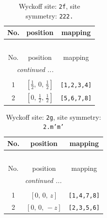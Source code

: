 \documentclass[fleqn,8pt]{jsarticle}
\begin{document}
\renewcommand{\arraystretch}{1.2}
\begin{longtable}{ccc}
\caption{Wyckoff site: {\tt 2f}, site symmetry: {\tt 222.}}
 \\
 \hline \hline
No. & position & mapping \\ \hline \endfirsthead

\multicolumn{2}{l}{\tablename\ \thetable{}} \\
 \hline \hline
No. & position & mapping \\ \hline \endhead

 \hline \hline
\multicolumn{2}{r}{\footnotesize\it continued ...} \\ \endfoot

 \hline \hline
\multicolumn{2}{r}{} \\ \endlastfoot

1 & $\left[ \frac{1}{2},\, 0,\, \frac{1}{2} \right]$ & {\tt [1,2,3,4]} \\ \hline
2 & $\left[ 0,\, \frac{1}{2},\, \frac{1}{2} \right]$ & {\tt [5,6,7,8]} \\
\end{longtable}
\renewcommand{\arraystretch}{1.2}
\begin{longtable}{ccc}
\caption{Wyckoff site: {\tt 2g}, site symmetry: {\tt 2.m'm'}}
 \\
 \hline \hline
No. & position & mapping \\ \hline \endfirsthead

\multicolumn{2}{l}{\tablename\ \thetable{}} \\
 \hline \hline
No. & position & mapping \\ \hline \endhead

 \hline \hline
\multicolumn{2}{r}{\footnotesize\it continued ...} \\ \endfoot

 \hline \hline
\multicolumn{2}{r}{} \\ \endlastfoot

1 & $\left[ 0,\, 0,\, z \right]$ & {\tt [1,4,7,8]} \\ \hline
2 & $\left[ 0,\, 0,\, - z \right]$ & {\tt [2,3,5,6]} \\
\end{longtable}
\renewcommand{\arraystretch}{1.2}
\end{document}
